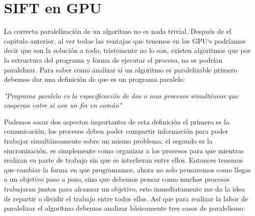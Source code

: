 \chapter{ SIFT en GPU}

La correcta paralelización de un algoritmo no es nada trivial. Después de el capitulo anterior, al ver todas las ventajas que tenemos en los GPU`s podríamos decir que son la solución a todo, tristemente no lo son, existen algoritmos que por la estructura del programa y forma de ejecutar el proceso, no se podrían paralelizar. Para saber como analizar si un algoritmo es paralelizable primero debemos dar una definición de que es un programa paralelo:

\begin{center}
\textit{"Programa paralelo es la especificación de dos o mas procesos simultáneos que cooperan entre si con un fin en común"}
\end{center}

Podemos sacar dos aspectos importantes de esta definición el primero es la comunicación, los procesos deben poder compartir información  para poder trabajar simultáneamente sobre un mismo problema; el segundo es la sincronización, es simplemente como organizar a los procesos para que mientras realizan su parte de trabajo sin que se interfieran entre ellos.
Entonces tenemos que cambiar la forma en que programamos, ahora no solo pensaremos como llegar a un objetivo paso a paso, sino  que debemos pensar como muchos procesos trabajaran juntos para alcanzar un objetivo, esto inmediatamente me da la idea de repartir o dividir el trabajo entre todos ellos. Así que para realizar la labor de paralelizar el algoritmo debemos analizar básicamente tres casos de paralelismo:
 
